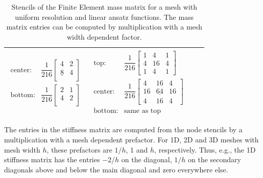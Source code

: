 \begin{table}
\begin{tabular}{|c|c|c|c}
\begin{minipage}{6cm}
\begin{equation*}
\begin{array}{ll}
        \text{center:} &
        \dfrac1{216}\left[\begin{array}{ccc}
            4 & 2\\
            \underline{8} & 4\\
        \end{array}\right] \\[4mm]
        \text{bottom:}& 
        \dfrac1{216}\left[\begin{array}{ccc}
            2 & 1\\
            4 & 2\\
        \end{array}\right]
      \end{array}
    \end{equation*}
  \end{minipage} &
  \begin{minipage}{6cm}
    \begin{equation*}
      \begin{array}{ll}
        \text{top:} &
        \dfrac1{216}\left[\begin{array}{ccc}
            1 & 4 & 1\\
            4 & 16 & 4\\
            1 & 4 & 1
        \end{array}\right] \\[4mm]
        \text{center:} &
        \dfrac1{216}\left[\begin{array}{ccc}
            4 & 16 & 4\\
            16 & \underline{64} & 16\\
            4 & 16 & 4
        \end{array}\right] \\[4mm]
        \text{bottom:}& \text{same as top}
      \end{array}  
    \end{equation*}
  \end{minipage}
  \\\hline
  \end{tabular}
  \caption{Stencils of the Finite Element mass matrix for a mesh with uniform resolution and linear ansatz functions. The mass matrix entries can be computed by multiplication with a mesh width dependent factor.}
  \label{tab:stencils_mass_laplace}
\end{table}

The entries in the stiffness matrix are computed from the node stencils by a multiplication with a mesh dependent prefactor.
For 1D, 2D and 3D meshes with mesh width $h$, these prefactors are $1/h$, 1 and $h$, respectively. Thus, e.g., the 1D stiffness matrix has the entries $-2/h$ on the diagonal, $1/h$ on the secondary diagonals above and below the main diagonal and zero everywhere else.

